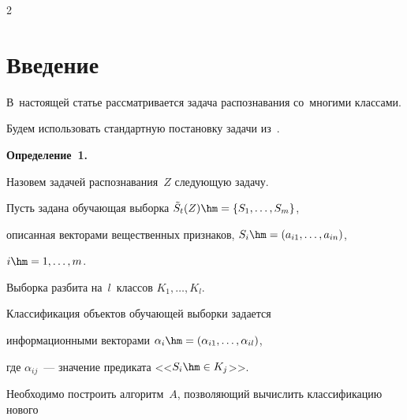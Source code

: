 












\thispagestyle{headings}





\begin{multicols}{2}





\label{st\stat}


  





\section{Введение}





В~настоящей статье рассматривается задача распознавания со~многими классами.


Будем использовать стандартную постановку задачи из~\cite{zhur1}.





\smallskip





\noindent


\textbf{Определение~1.}\


Назовем задачей распознавания~$Z$ следующую задачу.


Пусть задана обучающая выборка $\tilde{S}_t(Z)\hm=\{S_1,\ldots,S_m\}$, 


описанная векторами вещественных признаков, $S_i\hm=(a_{i1}, \ldots, a_{in})$, 


$i\hm=1,\ldots,m$.


Выборка разбита на~$l$~классов $K_1,\dots,K_l$.


Классификация объектов обучающей выборки задается 


информационными векторами ${\alpha_i}\hm=(\alpha_{i1}, \ldots, \alpha_{il})$, 


где $\alpha_{ij}$~--- значение предиката <<$S_i\hm\in K_j$>>.


Необходимо построить алгоритм~$A$, позволяющий вычислить классификацию нового 



\end{multicols}
